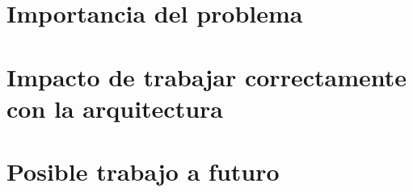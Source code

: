 
\section{Importancia del problema}
\section{Impacto de trabajar correctamente con la arquitectura}
\section{Posible trabajo a futuro}
